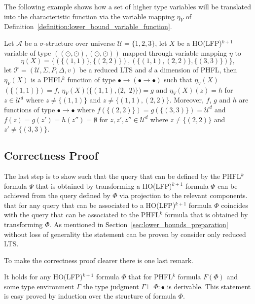 The following example shows how a set of higher type variables will be translated into the characteristic function via the
variable mapping $\eta_V$ of Definition~\ref{definition:lower_bound_variable_function}.

\begin{example}
    Let $\mathcal{A}$ be a $\sigma$-structure over universe $\mathcal{U} = \{1, 2, 3\}$, let $X$ be a HO(LFP)$^{k + 1}$
    variable of type $((\odot, \odot), (\odot, \odot))$ mapped through variable mapping $\eta$ to
    \[\eta(X) = \{(\{(1, 1)\}, \{(2, 2)\}), (\{(1, 1), (2, 2)\}, \{(3, 3)\})\},\]
    let $\mathcal{T} = (\mathcal{U}, \Sigma, P, \Delta, v)$ be a reduced LTS and $d$ a dimension of PHFL, then $\eta_V(X)$ is a PHFL$^k$ function of type $\bullet \rightarrow (\bullet \rightarrow \bullet)$ such
    that $\eta_V(X)$ $(\{(1, 1)\}) = f$, $\eta_V(X)(\{(1, 1), (2, $ $2)\}) = g$ and $\eta_V(X)(z) = h$ for $z \in
    \mathcal{U}^d$ where $z \neq \{(1, 1)\}$ and $z \neq \{(1, 1), (2, 2)\}$. Moreover, $f$, $g$ and $h$ are functions of type $\bullet
    \rightarrow \bullet$ where $f(\{(2, 2)\}) = g(\{(3, 3)\}) = \mathcal{U}^d$ and $f(z) = g(z') = h(z'') = \emptyset$ for $z,
    z', z'' \in \mathcal{U}^d$ where $z \neq \{(2, 2)\}$ and $z' \neq \{(3, 3)\}$.
\end{example}

\subsection{Correctness Proof}\label{subsec:lower_bounds_correctness_lfp}

The last step is to show such that the query that can be defined by the PHFL$^k$ formula $\Psi$ that is obtained by transforming a HO(LFP)$^{k+1}$ formula $\Phi$ can be achieved from the query defined by $\Phi$ via projection to the relevant components. that for any query that can be associated to a HO(LFP)$^{k+1}$ formula $\Phi$ coincides with the query that can be associated to the PHFL$^k$ formula that is obtained by transforming $\Phi$. As mentioned in Section~\ref{sec:lower_bounds_preparation} without loss of generality the statement can be proven by consider only  reduced LTS. 

To make the correctness proof clearer there is one last remark.

\begin{remark}
    It holds for any HO(LFP)$^{k+1}$ formula $\Phi$ that for PHFL$^k$ formula $F(\Phi)$ and some type environment $\Gamma$ the type judgment $\Gamma \vdash
    \Phi \colon \bullet$ is derivable. This statement
    is easy proved by induction over the structure of formula $\Phi$. 
\end{remark}

